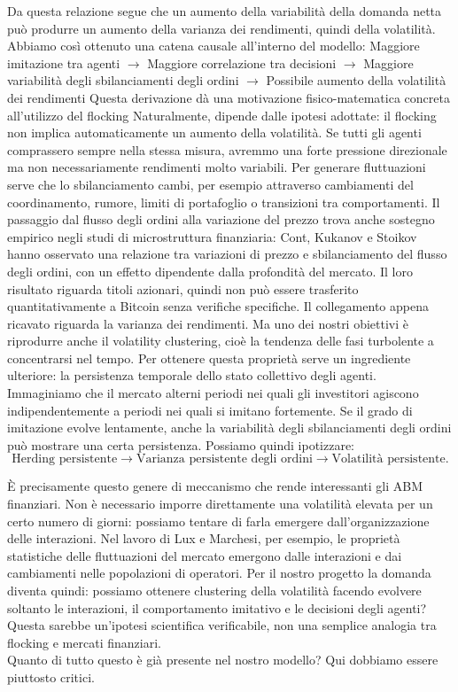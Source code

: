 Da questa relazione segue che un aumento della variabilità della domanda netta può produrre un aumento della varianza dei rendimenti, quindi della 
volatilità. Abbiamo così ottenuto una catena causale all'interno del modello:
Maggiore imitazione tra agenti $\to$ Maggiore correlazione tra decisioni $\to$ Maggiore variabilità degli sbilanciamenti degli ordini $\to$ Possibile aumento della volatilità dei rendimenti
Questa derivazione dà una motivazione fisico-matematica concreta all'utilizzo del flocking Naturalmente, dipende dalle ipotesi adottate: il flocking 
non implica automaticamente un aumento della volatilità. Se tutti gli agenti comprassero sempre nella stessa misura, avremmo una forte pressione 
direzionale ma non necessariamente rendimenti molto variabili. Per generare fluttuazioni serve che lo sbilanciamento cambi, per esempio attraverso 
cambiamenti del coordinamento, rumore, limiti di portafoglio o transizioni tra comportamenti. Il passaggio dal flusso degli ordini alla variazione 
del prezzo trova anche sostegno empirico negli studi di microstruttura finanziaria: Cont, Kukanov e Stoikov hanno osservato una relazione tra 
variazioni di prezzo e sbilanciamento del flusso degli ordini, con un effetto dipendente dalla profondità del mercato. Il loro risultato riguarda 
titoli azionari, quindi non può essere trasferito quantitativamente a Bitcoin senza verifiche specifiche.
Il collegamento appena ricavato riguarda la varianza dei rendimenti. Ma uno dei nostri obiettivi è riprodurre anche il volatility clustering, cioè la tendenza delle fasi turbolente a concentrarsi nel tempo.
Per ottenere questa proprietà serve un ingrediente ulteriore: la persistenza temporale dello stato collettivo degli agenti.
Immaginiamo che il mercato alterni periodi nei quali gli investitori agiscono indipendentemente a periodi nei quali si imitano fortemente.
Se il grado di imitazione evolve lentamente, anche la variabilità degli sbilanciamenti degli ordini può mostrare una certa persistenza.
Possiamo quindi ipotizzare:
\[
\text{Herding persistente}
\longrightarrow
\text{Varianza persistente degli ordini}
\longrightarrow
\text{Volatilità persistente}.
\]

È precisamente questo genere di meccanismo che rende interessanti gli ABM finanziari. Non è necessario imporre direttamente una volatilità elevata 
per un certo numero di giorni: possiamo tentare di farla emergere dall'organizzazione delle interazioni. Nel lavoro di Lux e Marchesi, per esempio, 
le proprietà statistiche delle fluttuazioni del mercato emergono dalle interazioni e dai cambiamenti nelle popolazioni di operatori.
Per il nostro progetto la domanda diventa quindi: possiamo ottenere clustering della volatilità facendo evolvere soltanto le interazioni, il 
comportamento imitativo e le decisioni degli agenti? Questa sarebbe un'ipotesi scientifica verificabile, non una semplice analogia tra flocking 
e mercati finanziari.\\
Quanto di tutto questo è già presente nel nostro modello?
Qui dobbiamo essere piuttosto critici.

